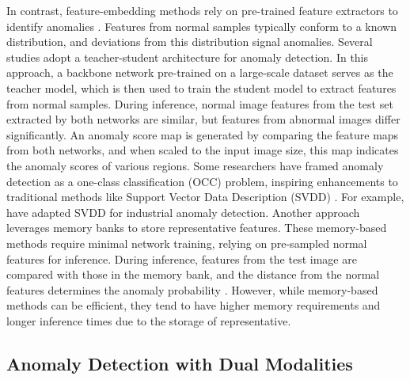 In contrast, feature-embedding methods rely on pre-trained feature extractors to identify anomalies \cite{rudolph2021same, wang2021student}. Features from normal samples typically conform to a known distribution, and deviations from this distribution signal anomalies. Several studies \cite{bergmann2020uninformed, salehi2021multiresolution, wang2021student, cao2022informative} adopt a teacher-student architecture for anomaly detection. In this approach, a backbone network pre-trained on a large-scale dataset serves as the teacher model, which is then used to train the student model to extract features from normal samples. During inference, normal image features from the test set extracted by both networks are similar, but features from abnormal images differ significantly. An anomaly score map is generated by comparing the feature maps from both networks, and when scaled to the input image size, this map indicates the anomaly scores of various regions. Some researchers have framed anomaly detection as a one-class classification (OCC) problem, inspiring enhancements to traditional methods like Support Vector Data Description (SVDD) \cite{tax2004support, defard2021padim}. For example, \cite{yi2021patch, zhang2021anomaly, hu2021semantic} have adapted SVDD for industrial anomaly detection. Another approach leverages memory banks \DIFdelbegin {}\DIFdelend \DIFaddbegin {}\DIFaddend to store representative features. These memory-based methods require minimal network training, relying on pre-sampled normal features for inference. During inference, features from the test image are compared with those in the memory bank, and the distance from the normal features determines the anomaly probability \cite{lee2022cfa, kim2023fapm, defard2021padim}. However, while memory-based methods can be efficient, they tend to have higher memory requirements and longer inference times due to the storage of representative.

\subsection*{Anomaly Detection with Dual Modalities}

